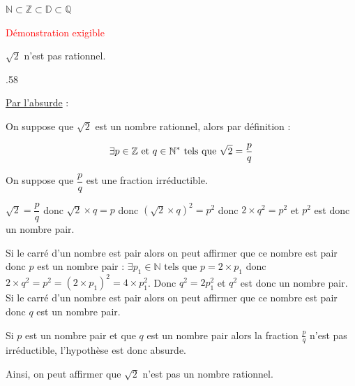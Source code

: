 \begin{pageCours}
{\begin{Rq}
$\mathbb{N}\subset\mathbb{Z}\subset\mathbb{D}\subset\mathbb{Q}$
\end{Rq}

\begin{Pp}
\textcolor{red}{Démonstration exigible}

$\sqrt{2}$ n'est pas rationnel.
\end{Pp}
}{.58\linewidth}{
\begin{Pv}
\underline{Par l'absurde} :

On suppose que $\sqrt{2}$ est un nombre rationnel, alors par définition : 

\[\exists p\in\mathbb Z \text{ et }q\in\mathbb N^{\ast}\text{ tels que }\sqrt{2}=\dfrac{p}{q}\]

On suppose que $\dfrac{p}{q}$ est une fraction irréductible.

$\sqrt{2}=\dfrac{p}{q}$ donc $\sqrt{2}\times q=p$ donc $(\sqrt{2}\times q)^2=p^2$ donc $2\times q^2=p^2$ et $p^2$ est donc un nombre pair.

Si le carré d'un nombre est pair alors on peut affirmer que ce nombre est pair donc $p$ est un nombre pair : $\exists p_1\in\mathbb{N}\text{ tels que }p=2\times p_1$ donc $2\times q^2=p^2=(2\times p_1)^2=4\times p_1^2$. Donc $q^2=2p_1^2$ et $q^2$ est donc un nombre pair. Si le carré d'un nombre est pair alors on peut affirmer que ce nombre est pair donc $q$ est un nombre pair.

Si $p$ est un nombre pair et que $q$ est un nombre pair alors la fraction $\frac{p}{q}$ n'est pas irréductible, l'hypothèse est donc absurde.

Ainsi, on peut affirmer que $\sqrt{2}$ n'est pas un nombre rationnel.
\end{Pv}
}




\end{pageCours} %


